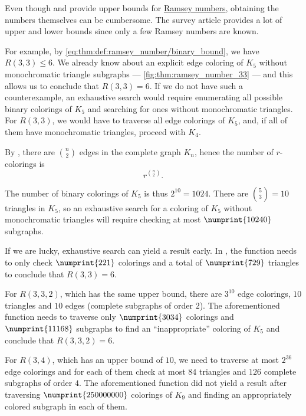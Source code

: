 \begin{remark}\label{rem:estimating_ramsey_numbers}
  Even though  and  provide upper bounds for \hyperref[def:ramsey_number]{Ramsey numbers}, obtaining the numbers themselves can be cumbersome. The survey article \cite{Radziszowski2021} provides a lot of upper and lower bounds since only a few Ramsey numbers are known.

  For example, by \eqref{eq:thm:def:ramsey_number/binary_bound}, we have \( R(3, 3) \leq 6 \). We already know about an explicit edge coloring of \( K_5 \) without monochromatic triangle subgraphs --- \cref{fig:thm:ramsey_number_33} --- and this allows us to conclude that \( R(3, 3) = 6 \). If we do not have such a counterexample, an exhaustive search would require enumerating all possible binary colorings of \( K_5 \) and searching for ones without monochromatic triangles. For \( R(3, 3) \), we would have to traverse all edge colorings of \( K_5 \), and, if all of them have monochromatic triangles, proceed with \( K_4 \).

  By , there are \( \binom n 2 \) edges in the complete graph \( K_n \), hence the number of \( r \)-colorings is
  \begin{equation*}
    r^{\binom n 2}.
  \end{equation*}

  The number of binary colorings of \( K_5 \) is thus \( 2^{10} = 1024 \). There are \( \binom 5 3 = 10 \) triangles in \( K_5 \), so an exhaustive search for a coloring of \( K_5 \) without monochromatic triangles will require checking at most \( \numprint{10 240} \) subgraphs.

  If we are lucky, exhaustive search can yield a result early. In \cite{code}, the function  needs to only check \( \numprint{221} \) colorings and a total of \( \numprint{729} \) triangles to conclude that \( R(3, 3) = 6 \).

  For \( R(3, 3, 2) \), which has the same upper bound, there are \( 3^{10} \) edge colorings, \( 10 \) triangles and \( 10 \) edges (complete subgraphs of order \( 2 \)). The aforementioned function needs to traverse only \( \numprint{3034} \) colorings and \( \numprint{11 168} \) subgraphs to find an \enquote{inappropriate} coloring of \( K_5 \) and conclude that \( R(3, 3, 2) = 6 \).

  For \( R(3, 4) \), which has an upper bound of \( 10 \), we need to traverse at most \( 2^{36} \) edge colorings and for each of them check at most \( 84 \) triangles and \( 126 \) complete subgraphs of order \( 4 \). The aforementioned function did not yield a result after traversing \( \numprint{250 000 000} \) colorings of \( K_9 \) and finding an appropriately colored subgraph in each of them.


\end{remark}
